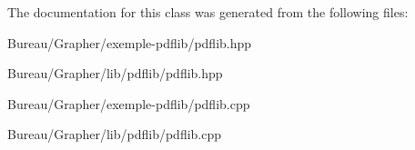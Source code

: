 \-The documentation for this class was generated from the following files\-:\begin{DoxyCompactItemize}
\item 
\-Bureau/\-Grapher/exemple-\/pdflib/pdflib.\-hpp\item 
\-Bureau/\-Grapher/lib/pdflib/pdflib.\-hpp\item 
\-Bureau/\-Grapher/exemple-\/pdflib/pdflib.\-cpp\item 
\-Bureau/\-Grapher/lib/pdflib/pdflib.\-cpp\end{DoxyCompactItemize}
